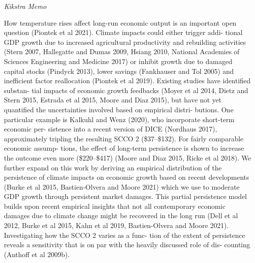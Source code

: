 \documentclass[
]{book}
\begin{document}
\emph{Kikstra Memo}

How temperature rises affect long-run economic
output is an important open question (Piontek et al
2021). Climate impacts could either trigger addi-
tional GDP growth due to increased agricultural
productivity and rebuilding activities (Stern 2007,
Hallegatte and Dumas 2009, Hsiang 2010, National
Academies of Sciences Engineering and Medicine
2017) or inhibit growth due to damaged capital
stocks (Pindyck 2013), lower savings (Fankhauser and
Tol 2005) and inefficient factor reallocation (Piontek
et al 2019). Existing studies have identified substan-
tial impacts of economic growth feedbacks (Moyer
et al 2014, Dietz and Stern 2015, Estrada et al 2015,
Moore and Diaz 2015), but have not yet quantified
the uncertainties involved based on empirical distri-
butions. One particular example is Kalkuhl and Wenz
(2020), who incorporate short-term economic per-
sistence into a recent version of DICE (Nordhaus
2017), approximately tripling the resulting SCCO 2
(\$37--\$132). For fairly comparable economic assump-
tions, the effect of long-term persistence is shown to
increase the outcome even more (\$220--\$417) (Moore
and Diaz 2015, Ricke et al 2018). We further expand
on this work by deriving an empirical distribution
of the persistence of climate impacts on economic
growth based on recent developments (Burke et al
2015, Bastien-Olvera and Moore 2021) which we use
to moderate GDP growth through persistent market
damages. This partial persistence model builds upon
recent empirical insights that not all contemporary
economic damages due to climate change might be
recovered in the long run (Dell et al 2012, Burke
et al 2015, Kahn et al 2019, Bastien-Olvera and Moore
2021). Investigating how the SCCO 2 varies as a func-
tion of the extent of persistence reveals a sensitivity
that is on par with the heavily discussed role of dis-
counting (Anthoff et al 2009b).
\end{document}
